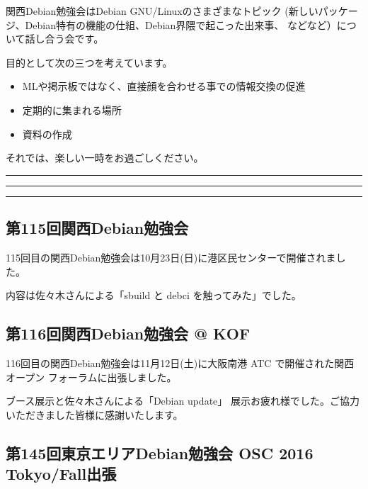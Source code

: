 \documentclass[mingoth,a4paper]{jsarticle}
\begin{document}
 関西Debian勉強会はDebian GNU/Linuxのさまざまなトピック
 (新しいパッケージ、Debian特有の機能の仕組、Debian界隈で起こった出来事、
 などなど）について話し合う会です。

 目的として次の三つを考えています。
 \begin{itemize}
  \item MLや掲示板ではなく、直接顔を合わせる事での情報交換の促進
  \item 定期的に集まれる場所
  \item 資料の作成
 \end{itemize}

 それでは、楽しい一時をお過ごしください。

\newpage

\begin{minipage}[b]{0.2\hsize}
 {}
\end{minipage}
\begin{minipage}[b]{0.8\hsize}
\hrule
\vspace{2mm}
\hrule
\setcounter{tocdepth}{1}
\tableofcontents
\vspace{2mm}
\hrule
\end{minipage}


\subsection{第115回関西Debian勉強会}

115回目の関西Debian勉強会は10月23日(日)に港区民センターで開催されました。

内容は佐々木さんによる「sbuild と debci を触ってみた」でした。

\subsection{第116回関西Debian勉強会 @ KOF}

116回目の関西Debian勉強会は11月12日(土)に大阪南港 ATC で開催された関西オープン
フォーラムに出張しました。

ブース展示と佐々木さんによる「Debian update」
展示お疲れ様でした。ご協力いただきました皆様に感謝いたします。

\subsection{第145回東京エリアDebian勉強会  OSC 2016 Tokyo/Fall出張}
\end{document}
